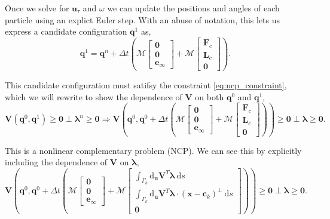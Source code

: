 \documentclass[preprint, 10pt]{elsarticle}
\begin{document}
Once we solve for $\mathbf{u}_\tau$ and $\omega$ we can update the positions and angles of each particle using an explict Euler step. With an abuse of notation, this lets us express a candidate configuration $\mathbf{q}^{1}$ as,
\[ \mathbf{q}^{1} = \mathbf{q}^n +  \Delta t\left(\mathcal{M}\begin{bmatrix}\mathbf{0}\\\mathbf{0}\\\mathbf{e}_\infty\end{bmatrix} + \mathcal{M}\begin{bmatrix}\mathbf{F}_c\\\mathbf{L}_c\\\mathbf{0}\end{bmatrix}\right).\]

This candidate configuration must satifsy the constraint \eqref{eq:ncp_constraint}, which we will rewrite to show the dependence of $\mathbf{V}$ on both $\mathbf{q}^0$ and $\mathbf{q}^{1}$,
\begin{equation}\label{eq:ncp_new}\mathbf{V}(\mathbf{q}^0,\mathbf{q}^{1})\geq \mathbf{0}\perp \pmb{\lambda}^n\geq \mathbf{0} \Rightarrow  \mathbf{V}\left(\mathbf{q}^0, \mathbf{q}^0 +  \Delta t\left(\mathcal{M}\begin{bmatrix}\mathbf{0}\\\mathbf{0}\\\mathbf{e}_\infty\end{bmatrix} + \mathcal{M}\begin{bmatrix}\mathbf{F}_c\\\mathbf{L}_c\\\mathbf{0}\end{bmatrix}\right)\right) \geq \mathbf{0} \perp\pmb{\lambda}\geq \mathbf{0} .\end{equation}

This is a nonlinear complementary problem (NCP). We can see this by explicitly including the dependence of $\mathbf{V}$ on $\pmb{\lambda}$,
\[\mathbf{V}\left(\mathbf{q}^0, \mathbf{q}^0 +  \Delta t\left(\mathcal{M}\begin{bmatrix}\mathbf{0}\\\mathbf{0}\\\mathbf{e}_\infty\end{bmatrix} + \mathcal{M}\begin{bmatrix} \int_{\Gamma_k} \text{d}_\mathbf{u}\mathbf{V}^T\pmb{\lambda}~\text{d}s\\ \int_{\Gamma_k}  \text{d}_\mathbf{u}\mathbf{V}^T\pmb{\lambda}\cdot(\mathbf{x}-\mathbf{c}_k)^\perp~\text{d}s \\\mathbf{0}\end{bmatrix}\right)\right) \geq \mathbf{0} \perp\pmb{\lambda}\geq \mathbf{0} .\]
\end{document}

